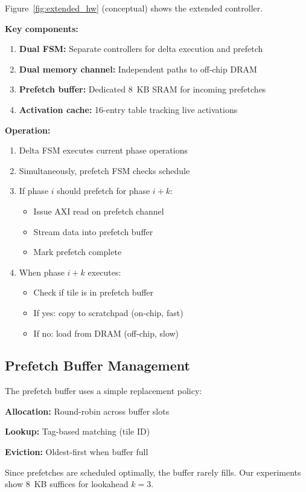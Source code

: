 \documentclass[journal]{IEEEtran}
\begin{document}
Figure~\ref{fig:extended_hw} (conceptual) shows the extended controller.

\textbf{Key components:}
\begin{enumerate}
\item \textbf{Dual FSM:} Separate controllers for delta execution and prefetch
\item \textbf{Dual memory channel:} Independent paths to off-chip DRAM
\item \textbf{Prefetch buffer:} Dedicated 8~KB SRAM for incoming prefetches
\item \textbf{Activation cache:} 16-entry table tracking live activations
\end{enumerate}

\textbf{Operation:}
\begin{enumerate}
\item Delta FSM executes current phase operations
\item Simultaneously, prefetch FSM checks schedule
\item If phase $i$ should prefetch for phase $i+k$:
\begin{itemize}
\item Issue AXI read on prefetch channel
\item Stream data into prefetch buffer
\item Mark prefetch complete
\end{itemize}
\item When phase $i+k$ executes:
\begin{itemize}
\item Check if tile is in prefetch buffer
\item If yes: copy to scratchpad (on-chip, fast)
\item If no: load from DRAM (off-chip, slow)
\end{itemize}
\end{enumerate}

\subsection{Prefetch Buffer Management}

The prefetch buffer uses a simple replacement policy:

\textbf{Allocation:} Round-robin across buffer slots

\textbf{Lookup:} Tag-based matching (tile ID)

\textbf{Eviction:} Oldest-first when buffer full

Since prefetches are scheduled optimally, the buffer rarely fills. Our experiments show 8~KB suffices for lookahead $k=3$.
\end{document}
